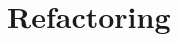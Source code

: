 \documentclass[smallextended]{svjour3}
\begin{document}








 
\section{Refactoring}
\end{document}
